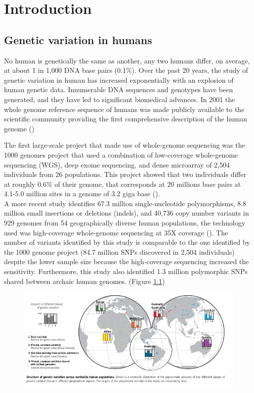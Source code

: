 \chapter{Introduction}
\label{Chapter1}




\section {Genetic variation in humans }

No human is genetically the same as another, any two humans differ, on average, at about 1 in 1,000 DNA base pairs (0.1\%).
Over the past 20 years, the study of genetic variation in human has increased exponentially with an explosion of human genetic data. 
Innumerable DNA sequences and genotypes have been generated, and they have led to significant biomedical advances. 
In 2001 the whole genome reference sequence of humans was made publicly available to the scientific community  providing the first comprehensive description of the human genome (\cite{lander2001initial})

The first large-scale project that made use of whole-genome sequencing was the 1000 genomes project that used a combination of low-coverage whole-genome sequencing (WGS), deep exome sequencing, and dense microarray of 2,504 individuals from 26 populations. 
This project showed that two individuals differ at roughly  0.6\% of their genome, that corresponds at 20 millions base pairs at 4.1-5.0 million sites in a genome of 3.2 giga base (\cite{1000genome2015global}). \\

A more recent study identifies 67.3 million single-nucleotide polymorphisms, 8.8 million small insertions or deletions (indels), and 40,736 copy number variants in 929 genomes from 54 geographically diverse human populations, the technology used was high-coverage whole-genome sequencing at 35X coverage (\cite{bergstrom2020insights}). 
The number of variants identified by this study is comparable to the one identified by the 1000 genome project (84.7 million SNPs discovered in 2,504 individuals) despite the lower sample size because the high-coverage sequencing increased the sensitivity. Furthermore, this study also identified 1.3 million polymorphic SNPs shared between archaic human genomes. (Figure \ref{fig:HGDP}) \\

\begin{figure}[H]
\centering
\includegraphics[width=1\textwidth]{Fig/HGDP.png}
\decoRule
\caption{}
\label{fig:HGDP}
\end{figure}

